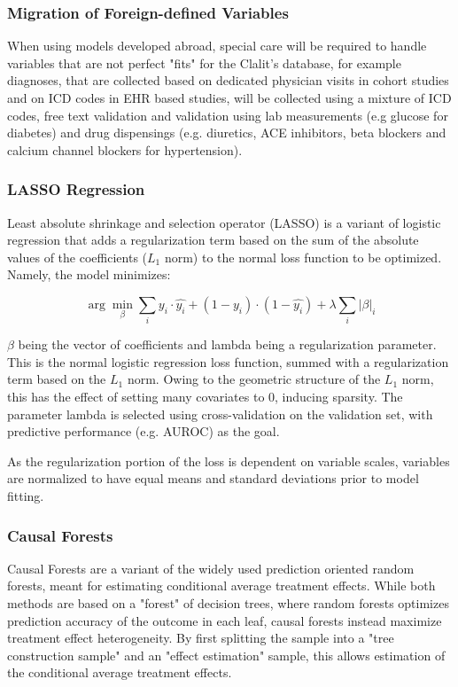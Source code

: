 \documentclass[a4paper,12pt]{article}
\begin{document}
		\subsubsection{Migration of Foreign-defined Variables}
		When using models developed abroad, special care will be required to handle variables that are not perfect "fits" for the Clalit's database, for example diagnoses, that are collected based on dedicated physician visits in cohort studies and on ICD codes in EHR based studies, will be collected using a mixture of ICD codes, free text validation and validation using lab measurements (e.g glucose for diabetes) and drug dispensings (e.g. diuretics, ACE inhibitors, beta blockers and calcium channel blockers for hypertension).
	
		\subsubsection{LASSO Regression}
		Least absolute shrinkage and selection operator (LASSO)\cite{Tibshirani2011} is a variant of logistic regression that adds a regularization term based on the sum of the absolute values of the coefficients ($ L_1 $ norm) to the normal loss function to be optimized. Namely, the model minimizes:
		
		\begin{equation*}
		\arg \min_\beta \sum_i y_i \cdot \hat{y_i} + (1- y_i) \cdot (1 - \hat{y_i}) + \lambda \sum_{i}|\beta|_i
		\end{equation*}
		
		$ \beta $ being the vector of coefficients and lambda being a regularization parameter. This is the normal logistic regression loss function, summed with a regularization term based on the $ L_1 $ norm. Owing to the geometric structure of the $ L_1 $ norm, this has the effect of setting many covariates to 0, inducing sparsity. The parameter lambda is selected using cross-validation on the validation set, with predictive performance (e.g. AUROC) as the goal.
		
		As the regularization portion of the loss is dependent on variable scales, variables are normalized to have equal means and standard deviations prior to model fitting.
		
		\subsubsection{Causal Forests}
		Causal Forests\cite{Wager2015} are a variant of the widely used prediction oriented random forests\cite{Breiman2001}, meant for estimating conditional average treatment effects. While both methods are based on a "forest" of decision trees, where random forests optimizes prediction accuracy of the outcome in each leaf, causal forests instead maximize treatment effect heterogeneity. By first splitting the sample into a "tree construction sample" and an "effect estimation" sample, this allows estimation of the conditional average treatment effects.
		
\end{document}
